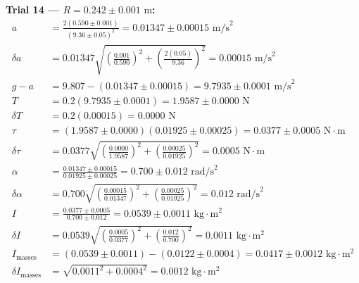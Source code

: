 \documentclass[11pt]{article}
\begin{document}
\textbf{Trial 14 — $R = 0.242 \pm 0.001\text{ m}$:}
\begin{align*}
a &= \frac{2(0.590 \pm 0.001)}{(9.36 \pm 0.05)^2} = 0.01347 \pm 0.00015\text{ m/s}^2 \\
\delta a &= 0.01347\sqrt{\left(\frac{0.001}{0.590}\right)^2 + \left(\frac{2(0.05)}{9.36}\right)^2} = 0.00015\text{ m/s}^2 \\
g - a &= 9.807 - (0.01347 \pm 0.00015) = 9.7935 \pm 0.0001\text{ m/s}^2 \\
T &= 0.2(9.7935 \pm 0.0001) = 1.9587 \pm 0.0000\text{ N} \\
\delta T &= 0.2(0.00015) = 0.0000\text{ N} \\
\tau &= (1.9587 \pm 0.0000)(0.01925 \pm 0.00025) = 0.0377 \pm 0.0005\text{ N}\cdot\text{m} \\
\delta\tau &= 0.0377\sqrt{\left(\frac{0.0000}{1.9587}\right)^2 + \left(\frac{0.00025}{0.01925}\right)^2} = 0.0005\text{ N}\cdot\text{m} \\
\alpha &= \frac{0.01347 \pm 0.00015}{0.01925 \pm 0.00025} = 0.700 \pm 0.012\text{ rad/s}^2 \\
\delta\alpha &= 0.700\sqrt{\left(\frac{0.00015}{0.01347}\right)^2 + \left(\frac{0.00025}{0.01925}\right)^2} = 0.012\text{ rad/s}^2 \\
I &= \frac{0.0377 \pm 0.0005}{0.700 \pm 0.012} = 0.0539 \pm 0.0011\text{ kg}\cdot\text{m}^2 \\
\delta I &= 0.0539\sqrt{\left(\frac{0.0005}{0.0377}\right)^2 + \left(\frac{0.012}{0.700}\right)^2} = 0.0011\text{ kg}\cdot\text{m}^2 \\
I_{\text{masses}} &= (0.0539 \pm 0.0011) - (0.0122 \pm 0.0004) = 0.0417 \pm 0.0012\text{ kg}\cdot\text{m}^2 \\
\delta I_{\text{masses}} &= \sqrt{0.0011^2 + 0.0004^2} = 0.0012\text{ kg}\cdot\text{m}^2
\end{align*}
\end{document}
